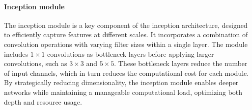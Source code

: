 \renewcommand*{\arraystretch}{1}

\paragraph*{Inception module} 
The inception module is a key component of the inception architecture, designed to efficiently capture features at different scales. 
It incorporates a combination of convolution operations with varying filter sizes within a single layer. 
The module includes $1\times 1$ convolutions as bottleneck layers before applying larger convolutions, such as $3\times 3$ and $5\times 5$. 
These bottleneck layers reduce the number of input channels, which in turn reduces the computational cost for each module. 
By strategically reducing dimensionality, the inception module enables deeper networks while maintaining a manageable computational load, optimizing both depth and resource usage.